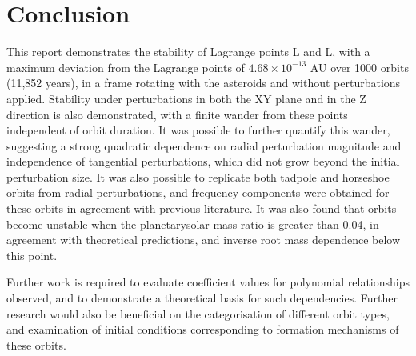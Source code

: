 \documentclass[11pt, a4paper,twocolumn]{article} %
\begin{document}
\section{Conclusion}
This report demonstrates the stability of Lagrange points L and L, with a maximum deviation from the Lagrange points of $4.68 \times 10^{-13}$ AU over 1000 orbits (11,852 years), in a frame rotating with the asteroids and without perturbations applied. Stability under perturbations in both the XY plane and in the Z direction is also demonstrated, with a finite wander from these points independent of orbit duration. It was possible to further quantify this wander, suggesting a strong quadratic dependence on radial perturbation magnitude and independence of tangential perturbations, which did not grow beyond the initial perturbation size.
It was also possible to replicate both tadpole and horseshoe orbits from radial perturbations, and frequency components were obtained for these orbits in agreement with previous literature. It was also found that orbits become unstable when the planetary\textendash solar mass ratio is greater than 0.04, in agreement with theoretical predictions, and inverse root mass dependence below this point.

Further work is required to evaluate coefficient values for polynomial relationships observed, and to demonstrate a theoretical basis for such dependencies.
Further research would also be beneficial on the categorisation of different orbit types, and examination of initial conditions corresponding to formation mechanisms of these orbits. 



\clearpage
\printbibliography
\end{document}
